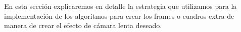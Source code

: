 En esta secci\'on explicaremos en detalle la estrategia que utilizamos para la implementaci\'on de los algoritmos para crear los frames o cuadros extra de manera de crear el efecto de c\'amara lenta deseado.